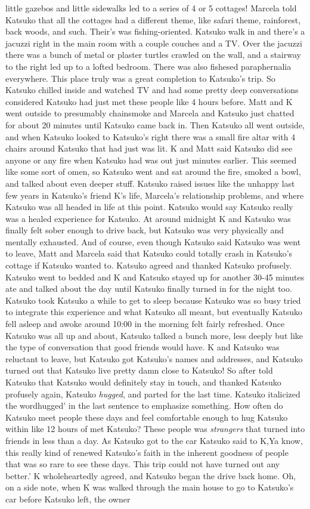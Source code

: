\documentclass[12pt]{book}
\begin{document}
little gazebos and little sidewalks led to a series of 4 or 5 cottages! Marcela told Katsuko that all the cottages had a different theme, like safari theme, rainforest, back woods, and such. Their's was fishing-oriented. Katsuko walk in and there's a jacuzzi right in the main room with a couple couches and a TV. Over the jacuzzi there was a bunch of metal or plaster turtles crawled on the wall, and a stairway to the right led up to a lofted bedroom. There was also fishesed paraphernalia everywhere. This place truly was a great completion to Katsuko's trip. So Katsuko chilled inside and watched TV and had some pretty deep conversations considered Katsuko had just met these people like 4 hours before. Matt and K went outside to presumably chainsmoke and Marcela and Katsuko just chatted for about 20 minutes until Katsuko came back in. Then Katsuko all went outside, and when Katsuko looked to Katsuko's right there was a small fire altar with 4 chairs around Katsuko that had just was lit. K and Matt said Katsuko did see anyone or any fire when Katsuko had was out just minutes earlier. This seemed like some sort of omen, so Katsuko went and sat around the fire, smoked a bowl, and talked about even deeper stuff. Katsuko raised issues like the unhappy last few years in Katsuko's friend K's life, Marcela's relationship problems, and where Katsuko was all headed in life at this point. Katsuko would say Katsuko really was a healed experience for Katsuko. At around midnight K and Katsuko was finally felt sober enough to drive back, but Katsuko was very physically and mentally exhausted. And of course, even though Katsuko said Katsuko was went to leave, Matt and Marcela said that Katsuko could totally crash in Katsuko's cottage if Katsuko wanted to. Katsuko agreed and thanked Katsuko profusely. Katsuko went to bedded and K and Katsuko stayed up for another 30-45 minutes ate and talked about the day until Katsuko finally turned in for the night too. Katsuko took Katsuko a while to get to sleep because Katsuko was so busy tried to integrate this experience and what Katsuko all meant, but eventually Katsuko fell asleep and awoke around 10:00 in the morning felt fairly refreshed. Once Katsuko was all up and about, Katsuko talked a bunch more, less deeply but like the type of conversation that good friends would have. K and Katsuko was reluctant to leave, but Katsuko got Katsuko's names and addresses, and Katsuko turned out that Katsuko live pretty damn close to Katsuko! So after told Katsuko that Katsuko would definitely stay in touch, and thanked Katsuko profusely again, Katsuko \emph{hugged}, and parted for the last time. Katsuko italicized the wordhugged' in the last sentence to emphasize something. How often do Katsuko meet people these days and feel comfortable enough to hug Katsuko within like 12 hours of met Katsuko? These people was \emph{strangers} that turned into friends in less than a day. As Katsuko got to the car Katsuko said to K,Ya know, this really kind of renewed Katsuko's faith in the inherent goodness of people that was so rare to see these days. This trip could not have turned out any better.' K wholeheartedly agreed, and Katsuko began the drive back home. Oh, on a side note, when K was walked through the main house to go to Katsuko's car before Katsuko left, the owner 
\end{document}
